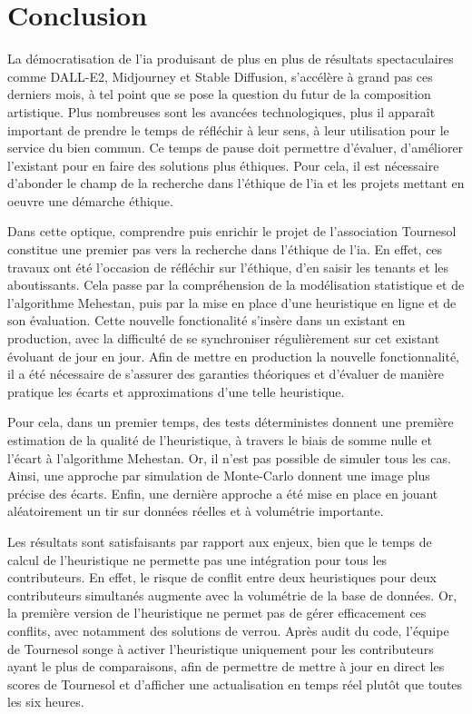 \section{Conclusion}

La démocratisation de l'\gls{ia} produisant de plus en plus de résultats spectaculaires comme DALL-E2, Midjourney et Stable Diffusion, s'accélère à grand pas ces derniers mois, à tel point que se pose la question du futur de la composition artistique. Plus nombreuses sont les avancées technologiques, plus il apparaît important de prendre le temps de réfléchir à leur sens, à leur utilisation pour le service du bien commun. Ce temps de pause doit permettre d'évaluer, d'améliorer l'existant pour en faire des solutions plus éthiques. Pour cela, il est nécessaire d'abonder le champ de la recherche dans l'éthique de l'\gls{ia} et les projets mettant en oeuvre une démarche éthique.

Dans cette optique, comprendre puis enrichir le projet de l'association Tournesol constitue une premier pas vers la recherche dans l'éthique de l'\gls{ia}. En effet, ces travaux ont été l'occasion de réfléchir sur l'éthique, d'en saisir les tenants et les aboutissants. Cela passe par la compréhension de la modélisation statistique et de l'algorithme Mehestan, puis par la mise en place d'une heuristique en ligne et de son évaluation. Cette nouvelle fonctionalité s'insère dans un existant en production, avec la difficulté de se synchroniser régulièrement sur cet existant évoluant de jour en jour. 
Afin de mettre en production la nouvelle fonctionnalité, il a été nécessaire de s'assurer des garanties théoriques et d'évaluer de manière pratique les écarts et approximations d'une telle heuristique.

Pour cela, dans un premier temps, des tests déterministes donnent une première estimation de la qualité de l'heuristique, à travers le biais de somme nulle et l'écart à l'algorithme Mehestan. Or, il n'est pas possible de simuler tous les cas. Ainsi, une approche par simulation de Monte-Carlo donnent une image plus précise des écarts. Enfin, une dernière approche a été mise en place en jouant aléatoirement un tir sur données réelles et à volumétrie importante.

Les résultats sont satisfaisants par rapport aux enjeux, bien que le temps de calcul de l'heuristique ne permette pas une intégration pour tous les contributeurs. En effet, le risque de conflit entre deux heuristiques pour deux contributeurs simultanés augmente avec la volumétrie de la base de données. Or, la première version de l'heuristique ne permet pas de gérer efficacement ces conflits, avec notamment des solutions de verrou. Après audit du code, l'équipe de Tournesol songe à activer l'heuristique uniquement pour les contributeurs ayant le plus de comparaisons, afin de permettre de mettre à jour en direct les scores de Tournesol et d'afficher une actualisation en temps réel plutôt que toutes les six heures.
\pagebreak